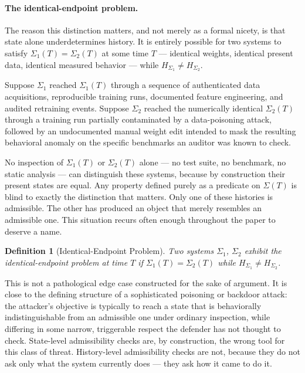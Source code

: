 \documentclass[11pt]{article}
\newtheorem{definition}{Definition}
\begin{document}
\paragraph{The identical-endpoint problem.} The reason this distinction matters, and not merely as a formal nicety, is that state alone underdetermines history. It is entirely possible for two systems to satisfy $\Sigma_1(T) = \Sigma_2(T)$ at some time $T$ --- identical weights, identical present data, identical measured behavior --- while $H_{\Sigma_1} \neq H_{\Sigma_2}$.

Suppose $\Sigma_1$ reached $\Sigma_1(T)$ through a sequence of authenticated data acquisitions, reproducible training runs, documented feature engineering, and audited retraining events. Suppose $\Sigma_2$ reached the numerically identical $\Sigma_2(T)$ through a training run partially contaminated by a data-poisoning attack, followed by an undocumented manual weight edit intended to mask the resulting behavioral anomaly on the specific benchmarks an auditor was known to check.

No inspection of $\Sigma_1(T)$ or $\Sigma_2(T)$ alone --- no test suite, no benchmark, no static analysis --- can distinguish these systems, because by construction their present states are equal. Any property defined purely as a predicate on $\Sigma(T)$ is blind to exactly the distinction that matters. Only one of these histories is admissible. The other has produced an object that merely resembles an admissible one. This situation recurs often enough throughout the paper to deserve a name.

\begin{definition}[Identical-Endpoint Problem]
Two systems $\Sigma_1$, $\Sigma_2$ exhibit the identical-endpoint problem at time $T$ if $\Sigma_1(T) = \Sigma_2(T)$ while $H_{\Sigma_1} \neq H_{\Sigma_2}$.
\end{definition}

This is not a pathological edge case constructed for the sake of argument. It is close to the defining structure of a sophisticated poisoning or backdoor attack: the attacker's objective is typically to reach a state that is behaviorally indistinguishable from an admissible one under ordinary inspection, while differing in some narrow, triggerable respect the defender has not thought to check. State-level admissibility checks are, by construction, the wrong tool for this class of threat. History-level admissibility checks are not, because they do not ask only what the system currently does --- they ask how it came to do it.
\end{document}
